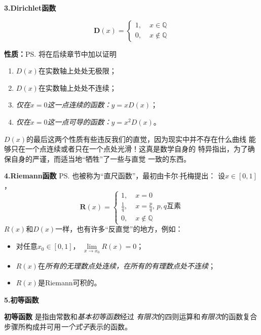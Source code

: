 \bs

{\bf 3.Dirichlet函数}

  $$\bm{D}(x) =\left\{
  \begin{array}{ll}
  	1,\;& x\in\mathbb{Q} \\
  	0,\;& x\notin\mathbb{Q}
  \end{array}
  \right.$$

  {\bf 性质：}\ps{将在后续章节中加以证明}
  \begin{enumerate}[(1)]
    \setlength{\itemindent}{1cm}
    \item $D(x)$在实数轴上处处无极限；
	\item $D(x)$在实数轴上处处不连续；
	\item {\it 仅在$x=0$这一点连续的函数：}$y=xD(x)$；
	\item {\it 仅在$x=0$这一点可导的函数：}$y=x^2D(x)$。
  \end{enumerate}

$D(x)$的最后这两个性质有些违反我们的直觉，因为现实中并不存在什么曲线
能够只在一个点连续或者只在一个点处光滑！这真是数学自身的
特异指出，为了确保自身的严谨，而适当地“牺牲”了一些与直觉
一致的东西。

\bs

{\bf 4.Riemann函数} \ps{也被称为“直尺函数”，最初由卡尔$\cdot$托梅提出}：
设$x\in[0,1]$，
  $$\bm{R}(x) =\left\{
	\begin{array}{ll}
	1,\;&x=0\\
	\displaystyle\frac 1q,\;&x=\displaystyle\frac pq,\,p,q\mbox{互素}\\
	0,\;&x\notin\mathbb{Q}
	\end{array}
  \right. $$
$R(x)$和$D(x)$一样，也有许多“反直觉”的地方，例如：
\begin{itemize}
	\item 对任意$x_0\in[0,1]$， $\lim\limits_{x\to x_0}R(x)=0$；
	\item $R(x)$在{\it 所有的无理数点处连续，在所有的有理数点处不连续}；
	\item $R(x)$是Riemann可积的。
\end{itemize}

\bs

{\bf 5.初等函数}

{\bf 初等函数}
是指由常数和{\it 基本初等函数}经过
{\it 有限次}的四则运算和{\it 有限次}的函数复合
步骤所构成并可用{\it 一个式子}表示的函数。

